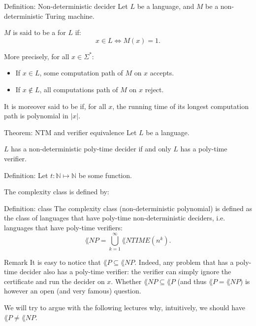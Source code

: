 \documentclass[a4paper]{article}
\begin{document}
\begin{parag}{Definition: Non-deterministic decider}
    Let $L$ be a language, and $M$ be a non-deterministic Turing machine.

    $M$ is said to be a  for $L$ if: 
    \[x \in L \iff M\left(x\right) = 1.\]

    More precisely, for all $x \in \Sigma^*$: 
    \begin{itemize}
        \item If $x \in L$, some computation path of $M$ on $x$ accepts.
        \item If $x \not \in L$, all computations path of $M$ on $x$ reject.
    \end{itemize}

    It is moreover said to be  if, for all $x$, the running time of its longest computation path is polynomial in $\left|x\right|$.
\end{parag}

\begin{parag}{Theorem: NTM and verifier equivalence}
    Let $L$ be a language.

    $L$ has a non-deterministic poly-time decider if and only $L$ has a poly-time verifier.
\end{parag}

\begin{parag}{Definition: }
    Let $t: \mathbb{N} \mapsto \mathbb{N}$ be some function.

    The  complexity class is defined by: 
\end{parag}

\begin{parag}{Definition:  class}
    The complexity class  (non-deterministic polynomial) is defined as the class of languages that have poly-time non-deterministic deciders, i.e. languages that have poly-time verifiers: 
    \[\lang{NP} = \bigcup_{k=1}^{\infty} \lang{NTIME}\left(n^k\right).\]

    \begin{subparag}{Remark}
        It is easy to notice that $\lang{P} \subseteq \lang{NP}$. Indeed, any problem that has a poly-time decider also has a poly-time verifier: the verifier can simply ignore the certificate and run the decider on $x$. Whether $\lang{NP} \subseteq \lang{P}$ (and thus $\lang{P} = \lang{NP}$) is however an open (and very famous) question.

        We will try to argue with the following lectures why, intuitively, we should have $\lang{P} \neq \lang{NP}$.
    \end{subparag}
\end{parag}
\end{document}

